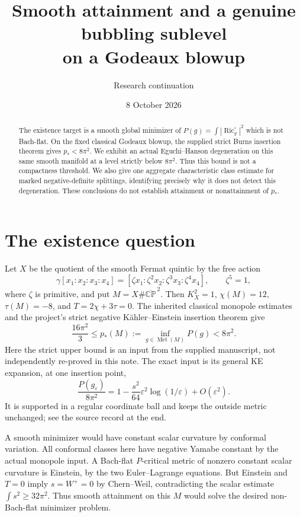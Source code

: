 \documentclass[11pt]{article}
\title{Smooth attainment and a genuine bubbling sublevel\\on a Godeaux blowup}
\author{Research continuation}
\date{8 October 2026}
\newcommand{\Ric}{\operatorname{Ric}}
\newcommand{\CP}{\mathbb{CP}}
\begin{document}
\maketitle
\begin{abstract}
The existence target is a smooth global minimizer of
$P(g)=\int|\Ric_g^\circ|^2$ which is not Bach-flat. On the fixed classical
Godeaux blowup, the supplied strict Burns insertion theorem gives
$p_*<8\pi^2$. We exhibit an actual Eguchi--Hanson degeneration on this
same smooth manifold at a level strictly below $8\pi^2$. Thus this bound
is not a compactness threshold. We also give one aggregate characteristic
class estimate for marked negative-definite splittings, identifying precisely
why it does not detect this degeneration. These conclusions do not establish
attainment or nonattainment of $p_*$.
\end{abstract}

\section{The existence question}
Let $X$ be the quotient of the smooth Fermat quintic by the free action
\[
 \gamma[x_1:x_2:x_3:x_4]
 =[\zeta x_1:\zeta^2x_2:\zeta^3x_3:\zeta^4x_4],\qquad \zeta^5=1,
\]
where $\zeta$ is primitive, and put $M=X\#\overline{\CP}^{\,2}$.
Then $K_X^2=1$, $\chi(M)=12$, $\tau(M)=-8$, and $T=2\chi+3\tau=0$.
The inherited classical monopole estimates and the project's strict
negative K\"ahler--Einstein insertion theorem give
\begin{equation}\label{eq:interval}
 \frac{16\pi^2}{3}\le p_*(M):=\inf_{g\in\operatorname{Met}(M)}P(g)<8\pi^2.
\end{equation}
Here the strict upper bound is an input from the supplied manuscript,
not independently re-proved in this note. The exact input is its general
KE expansion, at one insertion point,
\[
 \frac{P(g_\varepsilon)}{8\pi^2}
 =1-\frac{s^2}{64}\varepsilon^2\log(1/\varepsilon)+O(\varepsilon^2).
\]
It is supported in a regular coordinate ball and keeps the outside metric
unchanged; see the source record at the end.

A smooth minimizer would have constant scalar curvature by conformal
variation. All conformal classes here have negative Yamabe constant by
the actual monopole input. A Bach-flat $P$-critical metric of nonzero
constant scalar curvature is Einstein, by the two Euler--Lagrange equations.
But Einstein and $T=0$ imply $s=W^+=0$ by Chern--Weil, contradicting the
scalar estimate $\int s^2\ge32\pi^2$. Thus smooth attainment on this $M$
would solve the desired non-Bach-flat minimizer problem.
\end{document}
